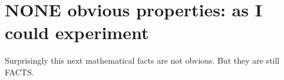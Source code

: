 \chapter{NONE obvious properties: as I could experiment}

	Surprisingly this next mathematical facts are not obvious. But they are still FACTS.